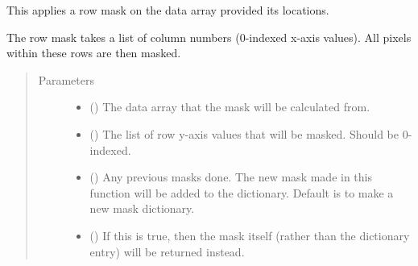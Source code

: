 \documentclass[letterpaper,10pt,english]{sphinxmanual}
\begin{document}

\begin{fulllineitems}
\label{\detokenize{python_docstrings/IfA_Smeargle.echo.masks.masks_echo300:IfA_Smeargle.echo.masks.masks_echo300.echo383_row_mask}}
This applies a row mask on the data array provided its locations.

The row mask takes a list of column numbers (0-indexed x-axis values). All pixels within
these rows are then masked.
\begin{quote}\begin{description}
\item[{Parameters}] \leavevmode\begin{itemize}
\item {} 
 () \textendash{} The data array that the mask will be calculated from.

\item {} 
 () \textendash{} The list of row y-axis values that will be masked. Should be 0-indexed.

\item {} 
 (\sphinxstyleliteralemphasis{\sphinxupquote{ (}}\sphinxstyleliteralemphasis{\sphinxupquote{)}}) \textendash{} Any previous masks done. The new mask made in this function will be added to the
dictionary. Default is to make a new mask dictionary.

\item {} 
 (\sphinxstyleliteralemphasis{\sphinxupquote{ (}}\sphinxstyleliteralemphasis{\sphinxupquote{)}}) \textendash{} If this is true, then the mask itself (rather than the dictionary entry) will be
returned instead.


\end{itemize}
\end{description}
\end{quote}
\end{fulllineitems}
\end{document}
